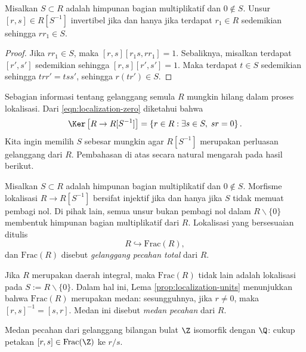 \begin{lemma}\label{prop:localization-units}
	Misalkan $S \subset R$ adalah himpunan bagian multiplikatif dan $0 \notin S$. Unsur $[r,s] \in R[S^{-1}]$ invertibel jika dan hanya jika terdapat $r_1 \in R$ sedemikian sehingga $rr_1 \in S$.
\end{lemma}
\begin{proof}
	Jika $rr_1 \in S$, maka $[r,s] [r_1 s, rr_1] = 1$. Sebaliknya, misalkan terdapat $[r',s']$ sedemikian sehingga $[r,s][r',s'] = 1$. Maka terdapat $t \in S$ sedemikian sehingga $trr' = tss'$, sehingga $r(tr') \in S$.
\end{proof}

Sebagian informasi tentang gelanggang semula $R$ mungkin hilang dalam proses lokalisasi. Dari \eqref{eqn:localization-zero} diketahui bahwa
\[ \Ker \left[ R \to R[S^{-1}] \right] = \left\{r \in R : \exists s \in S, \; sr=0 \right\}. \]
Kita ingin memilih $S$ sebesar mungkin agar $R[S^{-1}]$ merupakan perluasan gelanggang dari $R$. Pembahasan di atas secara natural mengarah pada hasil berikut.
\begin{lemma}
	Misalkan $S \subset R$ adalah himpunan bagian multiplikatif dan $0 \notin S$. Morfisme lokalisasi $R \to R[S^{-1}]$ bersifat injektif jika dan hanya jika $S$ tidak memuat pembagi nol. Di pihak lain, semua unsur bukan pembagi nol dalam $R \smallsetminus \{0\}$ membentuk himpunan bagian multiplikatif dari $R$. Lokalisasi yang bersesuaian ditulis
	\[ R \hookrightarrow \text{Frac}(R), \]
	dan $\text{Frac}(R)$ disebut \emph{gelanggang pecahan total} dari $R$.
\end{lemma}
Jika $R$ merupakan daerah integral, maka $\text{Frac}(R)$ tidak lain adalah lokalisasi pada $S := R \smallsetminus \{0\}$. Dalam hal ini, Lema \ref{prop:localization-units} menunjukkan bahwa $\text{Frac}(R)$ merupakan medan: sesungguhnya, jika $r \neq 0$, maka $[r,s]^{-1} = [s,r]$. Medan ini disebut \emph{medan pecahan} dari $R$. 

\begin{example}
	Medan pecahan dari gelanggang bilangan bulat $\Z$ isomorfik dengan $\Q$: cukup petakan $[r,s] \in \text{Frac}(\Z)$ ke $r/s$.
\end{example}

